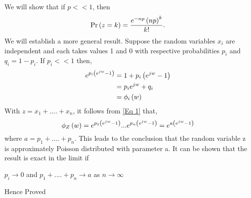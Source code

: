 \documentclass[journal,12pt,two column]{IEEEtran}
\begin{document}
\begin{enumerate}[label = (\alph*)]
    We will show that if $p << 1$, then
    \begin{equation}
        \Pr\left(z = k\right) = \frac{e^{-np}\left(np\right)^k}{k!}.
    \end{equation}
    We will establish a more general result. Suppose the random variables $x_i$ are independent and each takes values 1 and 0 with respective probabilities $p_i$ and $q_i = 1 - p_i$. If $p_i << 1$ then,
    \begin{align}
        e^{p_i\left(e^{jw}-1\right)} &= 1 + p_i\left(e^{jw} - 1\right) \\
                             &= p_ie^{jw} + q_i \\
                             &= \phi_i\left(w\right)
    \end{align}
    With $z = x_1 + ....+x_n$, it follows from \eqref{Eq 1} that,
    \begin{equation}
        \phi_Z\left(w\right) = e^{p_1\left(e^{jw}-1\right)}...e^{p_n\left(e^{jw}-1\right)} = e^{a\left(e^{jw}-1\right)}
    \end{equation}
    where $a = p_1 + ....+p_n$. This leads to the conclusion that the random variable z is approximately Poisson distributed with parameter a. It can be shown that the result is exact in the limit if
    
     $p_i \rightarrow 0$ and $p_1 + ....+p_n \rightarrow a$  as $n \rightarrow \infty$   
     
     Hence Proved
    
\end{enumerate}
\end{document}
